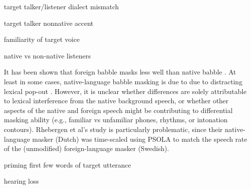 \begin{itm}
	\item{target talker/listener dialect mismatch}
	\item{target talker nonnative accent}
	\item{familiarity of target voice}
	\item{native vs non-native listeners \citep{CookeEtAl2008, CookeEtAl2010, BrouwerEtAl2012}}
	\item{It has been shown that foreign babble masks less well than native babble \citep{RhebergenEtAl2005,VanEngenBradlow2007,WuEtAl2011}.  At least in some cases, native-language babble masking is due to due to distracting lexical pop-out \citep{HoenEtAl2007}.  However, it is unclear whether differences are solely attributable to lexical interference from the native background speech, or whether other aspects of the native and foreign speech might be contributing to differential masking ability (e.g., familiar vs unfamiliar phones, rhythms, or intonation contours). Rhebergen et al's study is particularly problematic, since their native-language masker (Dutch) was time-scaled using PSOLA to match the speech rate of the (unmodified) foreign-language masker (Swedish).}
	\item{priming first few words of target utterance \citep{FreymanEtAl2004}}
	\item{hearing loss}
\end{itm}

